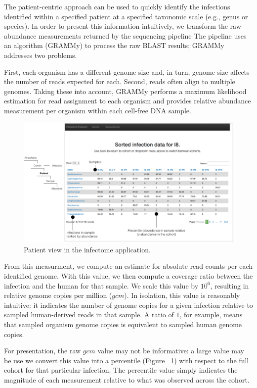 The patient-centric approach can be used to quickly identify the infections identified within a specified patient at a specified taxonomic scale (e.g., genus or species). In order to present this information intuitively, we transform the raw abundance measurements returned by the sequencing pipeline The pipeline uses an algorithm (GRAMMy) to process the raw BLAST results; GRAMMy addresses two problems. 

First, each organism has a different genome size and, in turn, genome size affects the number of reads expected for each. Second, reads often align to multiple genomes. Taking these into account, GRAMMy performs a maximum likelihood estimation for read assignment to each organism and provides relative abundance measurement per organism within each cell-free DNA sample. 

\begin{figure}
\center\includegraphics[width=150mm,scale=0.5]{Figures/Fig6}
\caption{Patient view in the infectome application.}
\label{fig:Fig6}
\end{figure}

From this measurment, we compute an estimate for absolute read counts per each identified genome. With this value, we then compute a coverage ratio between the infection and the human for that sample. We scale this value by $10^6$, resulting in relative genome copies per million ($gcm$). In isolation, this value is reasonably intuitive: it indicates the number of genome copies for a given infection relative to sampled human-derived reads in that sample. A ratio of $1$, for example, means that sampled organism genome copies is equivalent to sampled human genome copies. 

For presentation, the raw $gcm$ value may not be informative: a large value may be use we convert this value into a percentile (Figure ~\ref{fig:Fig6}) with respect to the full cohort for that particular infection. The percentile value simply indicates the magnitude of each measurement relative to what was observed across the cohort. 

